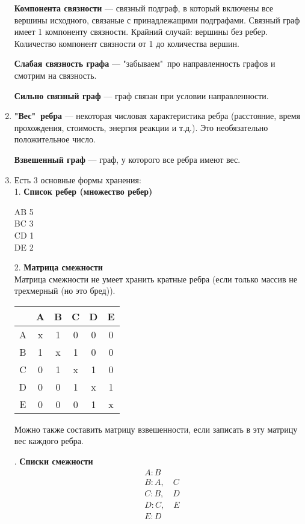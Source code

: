 \documentclass[a4paper,12pt]{article}
\theoremstyle{plain} %
\theoremstyle{definition} %
\theoremstyle{remark} %
\newcounter{num}
\begin{document}
\begin{enumerate}
\textbf{Компонента связности} --- связный подграф, в который включены все вершины исходного, связаные с принадлежащими подграфами. Связный граф имеет 1 компоненту связности. Крайний случай: вершины без ребер. Количество компонент связности от 1 до количества вершин.

\textbf{Слабая связность графа} --- "забываем"\  про направленность графов и смотрим на связность.

\textbf{Сильно связный граф} --- граф связан при условии направленности.

\item \textbf{"Вес"\  ребра} --- некоторая числовая характеристика ребра (расстояние, время прохождения, стоимость, энергия реакции и т.д.). Это необязательно положительное число.

\textbf{Взвешенный граф} --- граф, у которого все ребра имеют вес.

\item Есть 3 основные формы хранения:\\
1. \textbf{Список ребер (множество ребер)}
\begin{center}
	AB 5\\
	BC 3\\
	CD 1\\
	DE 2\\
\end{center}
2. \textbf{Матрица смежности}\\
Матрица смежности не умеет хранить кратные ребра (если только массив не трехмерный (но это бред)).

\begin{center}
	\begin{tabular}{|c|c|c|c|c|c|}
		\hline 
		& A & B & C & D & E \\ 
		\hline 
		A & x & 1 & 0 & 0 & 0 \\ 
		\hline 
		B & 1 & x & 1 & 0 & 0 \\ 
		\hline 
		C & 0 & 1 & x & 1 & 0 \\ 
		\hline 
		D & 0 & 0 & 1 & x & 1 \\ 
		\hline 
		E & 0 & 0 & 0 & 1 & x \\ 
		\hline 
	\end{tabular}
\end{center}

Можно  также составить матрицу взвешенности, если записать в эту матрицу вес каждого ребра.

. \textbf{Списки смежности}\\
\begin{align*}
&A : B\\
&B : A, \quad C\\
&C : B, \quad D\\
&D : C, \quad E\\
&E : D\\
\end{align*}


\end{enumerate}
\end{document}
